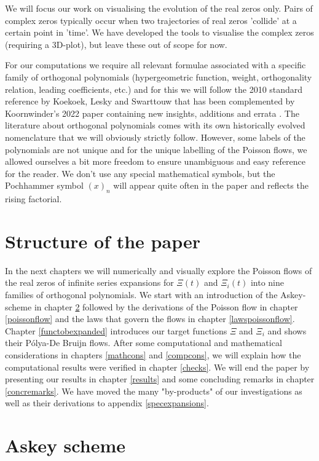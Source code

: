 \documentclass[a4paper,11pt,twoside]{amsart}
\begin{document}
We will focus our work on visualising the evolution of the real zeros only. Pairs of complex zeros typically occur when two trajectories of real zeros 'collide' at a certain point in 'time'. We have developed the tools to visualise the complex zeros (requiring a 3D-plot), but leave these out of scope for now. 

For our computations we require all relevant formulae  associated with a specific family of orthogonal polynomials (hypergeometric function, weight, orthogonality relation, leading coefficients, etc.) and for this we will follow the 2010 standard reference by Koekoek, Lesky and Swarttouw \cite{koe} that has been complemented by Koornwinder's 2022 paper containing new insights, additions and errata \cite{koesup}. The literature about orthogonal polynomials comes with its own historically evolved nomenclature that we will obviously strictly follow. However, some labels of the polynomials are not unique and for the unique labelling of the Poisson flows, we allowed ourselves a bit more freedom to ensure unambiguous and easy reference for the reader. We don't use any special mathematical symbols, but the Pochhammer symbol $(x)_n$ will appear quite often in the paper and reflects the rising factorial.

\section{Structure of the paper}
In the next chapters we will numerically and visually explore the Poisson flows of the real zeros of infinite series expansions for $\Xi(t)$ and $\Xi_i(t)$ into nine families of orthogonal polynomials. We start with an introduction of the Askey-scheme in chapter \ref{askeyscheme} followed by the derivations of the Poisson flow in chapter \ref{poissonflow} and the laws that govern the flows in chapter \ref{lawspoissonflow}. Chapter \ref{functobexpanded} introduces our target functions $\Xi$ and $\Xi_i$ and shows their Pólya-De Bruijn flows. After some computational and mathematical considerations in chapters \ref{mathcons} and \ref{compcons}, we will explain how the computational results were verified in chapter \ref{checks}. We will end the paper by presenting our results in chapter \ref{results} and some concluding remarks in chapter \ref{concremarks}. We have moved the many "by-products" of our investigations as well as their derivations to appendix \ref{specexpansions}. 

\pagebreak
\section{Askey scheme}\label{askeyscheme}
\end{document}
